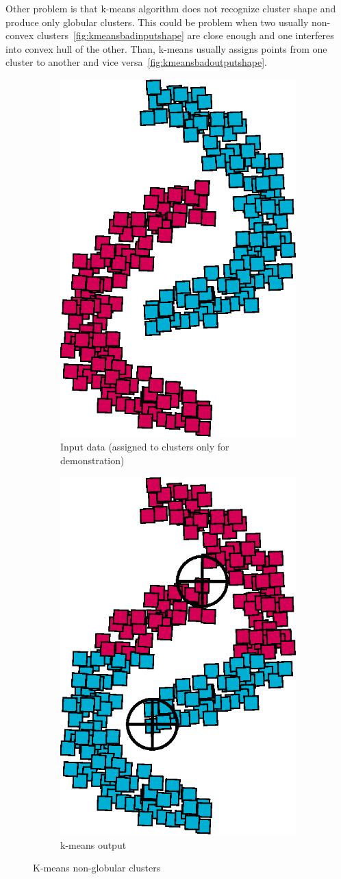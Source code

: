 Other problem is that k-means algorithm does not recognize cluster shape and produce only globular clusters. This could be problem when two usually non-convex clusters~\autoref{fig:kmeansbadinputshape} are close enough and one interferes into convex hull of the other. Than, k-means usually assigns points from one cluster to another and vice versa~\autoref{fig:kmeansbadoutputshape}.
\begin{figure}[h]
\begin{subfigure}{.49\textwidth}
  \centering
  \includegraphics[width=.5\linewidth]{img/kmeans_badInputSampleShape.eps}
  \caption{Input data (assigned to clusters only for demonstration)}
  \label{fig:kmeansbadinputshape}
\end{subfigure}
\begin{subfigure}{.49\textwidth}
  \centering
  \includegraphics[width=.5\linewidth]{img/kmeans_badOutputSampleShape.eps}
  \caption{k-means output}
  \label{fig:kmeansbadoutputshape}
\end{subfigure}
\caption{K-means non-globular clusters}
\end{figure}

